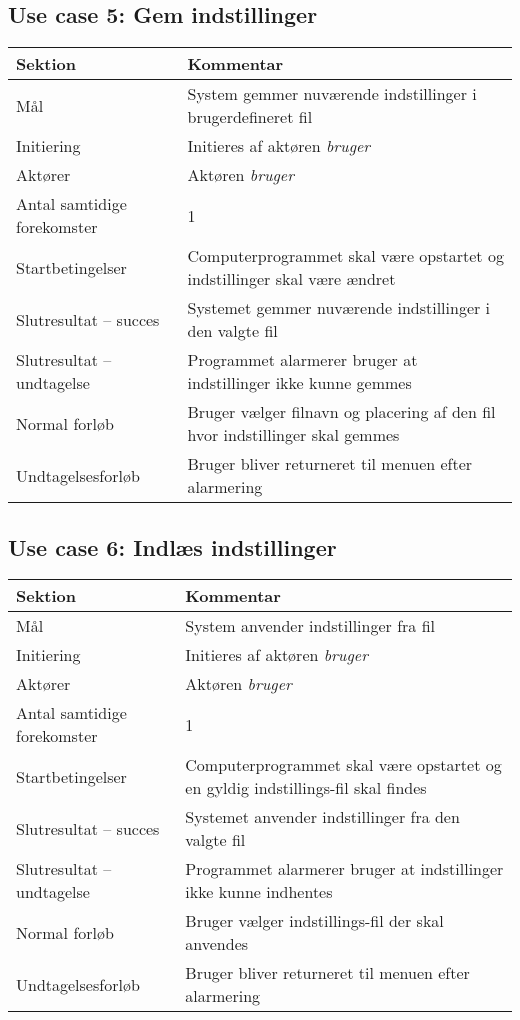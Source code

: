 \documentclass[a4paper,oneside,12pt]{article}
\begin{document}
	\subsection{Use case 5: Gem indstillinger}
	\begin{tabular}{|l|p{7.7cm}|}
		\hline \textbf{Sektion} 	& \textbf{Kommentar} \\ 
		\hline Mål  & System gemmer nuværende indstillinger i brugerdefineret fil \\ 
		\hline Initiering  & Initieres af aktøren \textit{bruger} \\ 
		\hline Aktører & Aktøren \textit{bruger} \\ 
		\hline Antal samtidige forekomster & 1 \\ 
		\hline Startbetingelser & Computerprogrammet skal være opstartet og indstillinger skal være ændret  \\ 
		\hline Slutresultat – succes & Systemet gemmer nuværende indstillinger i den valgte fil \\ 
		\hline Slutresultat – undtagelse & Programmet alarmerer bruger at indstillinger ikke kunne gemmes \\ 
		\hline Normal forløb & Bruger vælger filnavn og placering af den fil hvor indstillinger skal gemmes \\ 
		\hline Undtagelsesforløb & Bruger bliver returneret til menuen efter alarmering \\ 
		\hline 
	\end{tabular}
	
	\subsection{Use case 6: Indlæs indstillinger}
	\begin{tabular}{|l|p{7.7cm}|}
		\hline \textbf{Sektion} 	& \textbf{Kommentar} \\ 
		\hline Mål  & System anvender indstillinger fra fil \\ 
		\hline Initiering  & Initieres af aktøren \textit{bruger} \\ 
		\hline Aktører & Aktøren \textit{bruger} \\ 
		\hline Antal samtidige forekomster & 1 \\ 
		\hline Startbetingelser & Computerprogrammet skal være opstartet og en gyldig indstillings-fil skal findes  \\ 
		\hline Slutresultat – succes & Systemet anvender indstillinger fra den valgte fil \\ 
		\hline Slutresultat – undtagelse & Programmet alarmerer bruger at indstillinger ikke kunne indhentes \\ 
		\hline Normal forløb & Bruger vælger indstillings-fil der skal anvendes \\ 
		\hline Undtagelsesforløb & Bruger bliver returneret til menuen efter alarmering \\ 
		\hline 
	\end{tabular}
	
\end{document}
